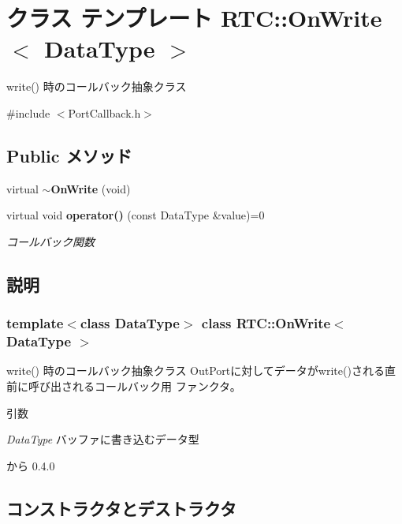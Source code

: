 \section{クラス テンプレート RTC::OnWrite$<$ DataType $>$}
\label{classRTC_1_1OnWrite}


write() 時のコールバック抽象クラス  




{\ttfamily \#include $<$PortCallback.h$>$}

\subsection*{Public メソッド}
\begin{DoxyCompactItemize}
\item 
virtual {\bf $\sim$OnWrite} (void)
\item 
virtual void {\bf operator()} (const DataType \&value)=0
\begin{DoxyCompactList}\small\item\em コールバック関数 \item\end{DoxyCompactList}\end{DoxyCompactItemize}


\subsection{説明}
\subsubsection*{template$<$class DataType$>$ class RTC::OnWrite$<$ DataType $>$}

write() 時のコールバック抽象クラス OutPortに対してデータがwrite()される直前に呼び出されるコールバック用 ファンクタ。


\begin{DoxyParams}{引数}
\item[{\em DataType}]バッファに書き込むデータ型\end{DoxyParams}
\begin{DoxySince}{から}
0.4.0 
\end{DoxySince}


\subsection{コンストラクタとデストラクタ}
